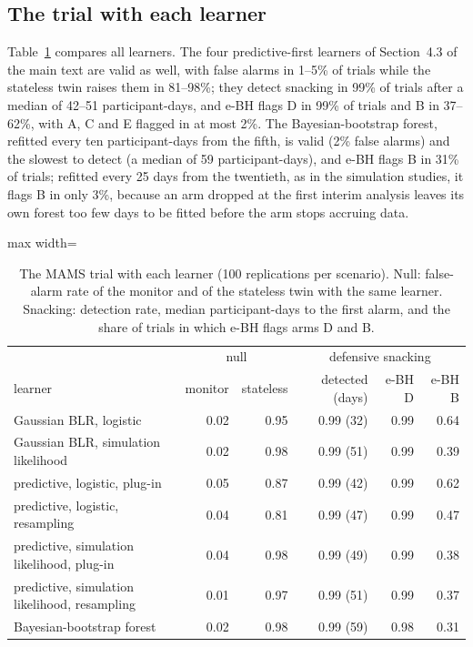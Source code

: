 \documentclass[11pt]{article}
\theoremstyle{remark}
\begin{document}
\subsection{The trial with each learner}

Table~\ref{tab:trial-learners} compares all learners. The four predictive-first
learners of Section~4.3 of the main text are valid as well, with false alarms in 1--5\%
of trials while the stateless twin raises them in 81--98\%; they detect snacking
in 99\% of trials after a median of 42--51 participant-days, and e-BH flags D in
99\% of trials and B in 37--62\%, with A, C and E flagged in at most 2\%.
The Bayesian-bootstrap forest, refitted every ten participant-days from the
fifth, is valid (2\% false alarms) and the slowest to detect (a median of 59
participant-days), and e-BH flags B in 31\% of trials; refitted every 25 days
from the twentieth, as in the simulation studies, it flags B in only 3\%,
because an arm dropped at the first interim analysis leaves its own forest
too few days to be fitted before the arm stops accruing data.

\begin{table}[t]
\centering
\caption{The MAMS trial with each learner (100 replications per scenario).
Null: false-alarm rate of the monitor and of the stateless twin with the same
learner. Snacking: detection rate, median participant-days to the first alarm,
and the share of trials in which e-BH flags arms D and B.}
\label{tab:trial-learners}
\begin{adjustbox}{max width=\textwidth}
\begin{tabular}{lrrrrr}
\toprule
 & \multicolumn{2}{c}{null} & \multicolumn{3}{c}{defensive snacking} \\
learner & monitor & stateless & detected (days) & e-BH D & e-BH B \\
\midrule
Gaussian BLR, logistic & 0.02 & 0.95 & 0.99 (32) & 0.99 & 0.64 \\
Gaussian BLR, simulation likelihood & 0.02 & 0.98 & 0.99 (51) & 0.99 & 0.39 \\
predictive, logistic, plug-in & 0.05 & 0.87 & 0.99 (42) & 0.99 & 0.62 \\
predictive, logistic, resampling & 0.04 & 0.81 & 0.99 (47) & 0.99 & 0.47 \\
predictive, simulation likelihood, plug-in & 0.04 & 0.98 & 0.99 (49) & 0.99 & 0.38 \\
predictive, simulation likelihood, resampling & 0.01 & 0.97 & 0.99 (51) & 0.99 & 0.37 \\
Bayesian-bootstrap forest & 0.02 & 0.98 & 0.99 (59) & 0.98 & 0.31 \\
\bottomrule
\end{tabular}
\end{adjustbox}
\end{table}
\end{document}
